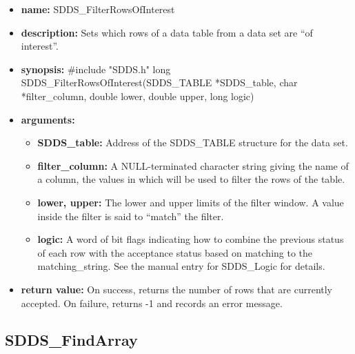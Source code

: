 \documentclass[11pt]{article}
\begin{document}
\begin{itemize}
\item {\bf name:}\newline
SDDS\_FilterRowsOfInterest
\item {\bf description:}\newline
Sets which rows of a data table from a data set are ``of interest''.
\item {\bf synopsis:} \#include "SDDS.h"\newline
long SDDS\_FilterRowsOfInterest(SDDS\_TABLE *SDDS\_table, char *filter\_column, double lower, double upper, long logic)
\item {\bf arguments:}
\begin{itemize}
\item {\bf SDDS\_table:} Address of the SDDS\_TABLE structure for the data set.
\item {\bf filter\_column:} A NULL-terminated character string giving the name of a column, the values in which will be used to filter the rows of the table.
\item {\bf lower, upper:} The lower and upper limits of the filter window. A value inside the filter is said to ``match'' the filter.
\item {\bf logic:} A word of bit flags indicating how to combine the previous status of each row with the acceptance status based on matching to the matching\_string. See the manual entry for SDDS\_Logic for details.
\end{itemize}
\item {\bf return value:}\newline
On success, returns the number of rows that are currently accepted. On failure, returns -1 and records an error message.
\end{itemize}

\subsection{SDDS\_FindArray}
\label{SDDS_FindArray}
\end{document}
